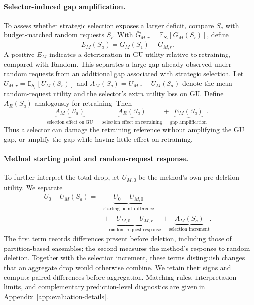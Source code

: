 \paragraph{Selector-induced gap amplification.}
To assess whether strategic selection exposes a larger deficit, compare $S_a$ with budget-matched random requests $S_r$. With $\bar G_{M,r}=\mathbb E_{S_r}[G_M(S_r)]$, define
\begin{equation}
E_M(S_a)=G_M(S_a)-\bar G_{M,r}.
\label{eq:gap-amplification}
\end{equation}
A positive $E_M$ indicates a deterioration in GU utility relative to retraining, compared with Random. This separates a large gap already observed under random requests from an additional gap associated with strategic selection. Let $\bar U_{M,r}=\mathbb E_{S_r}[U_M(S_r)]$ and $A_M(S_a)=\bar U_{M,r}-U_M(S_a)$ denote the mean random-request utility and the selector's extra utility loss on GU. Define $A_R(S_a)$ analogously for retraining. Then
\begin{equation}
\underbrace{A_M(S_a)}_{\text{selection effect on GU}}
=\underbrace{A_R(S_a)}_{\text{selection effect on retraining}}
+\underbrace{E_M(S_a)}_{\text{gap amplification}}.
\label{eq:selection-decomposition}
\end{equation}
Thus a selector can damage the retraining reference without amplifying the GU gap, or amplify the gap while having little effect on retraining.

\paragraph{Method starting point and random-request response.}
To further interpret the total drop, let $U_{M,0}$ be the method's own pre-deletion utility. We separate
\begin{equation}
\begin{aligned}
U_0-U_M(S_a)
={}&\underbrace{U_0-U_{M,0}}_{\text{starting-point difference}}\\
&+\underbrace{U_{M,0}-\bar U_{M,r}}_{\text{random-request response}}
+\underbrace{A_M(S_a)}_{\text{selection increment}}.
\end{aligned}
\label{eq:three-part}
\end{equation}
The first term records differences present before deletion, including those of partition-based ensembles; the second measures the method's response to random deletion. Together with the selection increment, these terms distinguish changes that an aggregate drop would otherwise combine. We retain their signs and compute paired differences before aggregation. Matching rules, interpretation limits, and complementary prediction-level diagnostics are given in Appendix~\ref{app:evaluation-details}.
